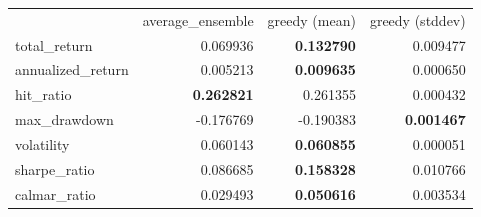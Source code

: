\begin{tabular}{lrrr}
 & average_ensemble & greedy (mean) & greedy (stddev) \\
total_return & 0.069936 & \bfseries 0.132790 & 0.009477 \\
annualized_return & 0.005213 & \bfseries 0.009635 & 0.000650 \\
hit_ratio & \bfseries 0.262821 & 0.261355 & 0.000432 \\
max_drawdown & -0.176769 & -0.190383 & \bfseries 0.001467 \\
volatility & 0.060143 & \bfseries 0.060855 & 0.000051 \\
sharpe_ratio & 0.086685 & \bfseries 0.158328 & 0.010766 \\
calmar_ratio & 0.029493 & \bfseries 0.050616 & 0.003534 \\
\end{tabular}
